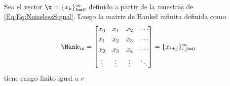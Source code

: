 	\begin{theorem}\label{Th:Kronecker}
		Sea el vector $\x = \{x_k\}_{k=0}^\infty$ definido a partir de la muestras de \eqref{Eq:Eq:NoiselessSignal}. Luego la matriz de Hankel infinita definida como 
		\begin{equation}
			\Hank_{\x} = \begin{bmatrix} x_0 & x_1 & x_2 & \cdots \\[0.3em] x_1 & x_2 & x_3 & \cdots \\[0.3em] x_2 & x_3 & x_4 & \cdots \\[0.3em]\vdots & \vdots & \vdots & \ddots \end{bmatrix}=\{x_{i+j}\}_{i,j=0}^{\infty}
			\label{Eq:InfiniteHankelMatrix}
		\end{equation}
		tiene rango finito igual a $r$ 
	\end{theorem}
